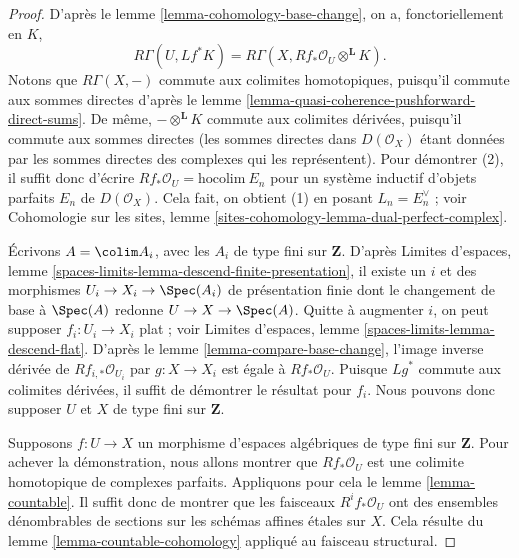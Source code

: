\begin{proof}
D'apr\`es le lemme \ref{lemma-cohomology-base-change}, on a, fonctoriellement
en $K$,
$$
R\Gamma(U, Lf^*K) = R\Gamma(X, Rf_*\mathcal{O}_U \otimes^\mathbf{L} K).
$$
Notons que $R\Gamma(X,-)$ commute aux colimites homotopiques, puisqu'il commute
aux sommes directes d'apr\`es le lemme
\ref{lemma-quasi-coherence-pushforward-direct-sums}. De m\^eme,
$-\otimes^\mathbf{L}K$ commute aux colimites d\'eriv\'ees, puisqu'il commute aux
sommes directes (les sommes directes dans $D(\mathcal{O}_X)$ \'etant donn\'ees
par les sommes directes des complexes qui les repr\'esentent). Pour d\'emontrer
(2), il suffit donc d'\'ecrire
$Rf_*\mathcal{O}_U=\text{hocolim}\ E_n$ pour un syst\`eme inductif d'objets
parfaits $E_n$ de $D(\mathcal{O}_X)$. Cela fait, on obtient (1) en posant
$L_n=E_n^\vee$ ; voir Cohomologie sur les sites, lemme
\ref{sites-cohomology-lemma-dual-perfect-complex}.

\medskip\noindent
\'Ecrivons $A=\colim A_i$, avec les $A_i$ de type fini sur $\mathbf{Z}$.
D'apr\`es Limites d'espaces, lemme
\ref{spaces-limits-lemma-descend-finite-presentation}, il existe un $i$ et des
morphismes $U_i\to X_i\to\Spec(A_i)$ de pr\'esentation finie dont le changement
de base \`a $\Spec(A)$ redonne $U\to X\to\Spec(A)$.
Quitte \`a augmenter $i$, on peut supposer $f_i:U_i\to X_i$ plat ; voir
Limites d'espaces, lemme \ref{spaces-limits-lemma-descend-flat}.
D'apr\`es le lemme \ref{lemma-compare-base-change}, l'image inverse d\'eriv\'ee
de $Rf_{i,*}\mathcal{O}_{U_i}$ par $g:X\to X_i$ est \'egale \`a
$Rf_*\mathcal{O}_U$. Puisque $Lg^*$ commute aux colimites d\'eriv\'ees, il
suffit de d\'emontrer le r\'esultat pour $f_i$. Nous pouvons donc supposer $U$
et $X$ de type fini sur $\mathbf{Z}$.

\medskip\noindent
Supposons $f:U\to X$ un morphisme d'espaces alg\'ebriques de type fini sur
$\mathbf{Z}$. Pour achever la d\'emonstration, nous allons montrer que
$Rf_*\mathcal{O}_U$ est une colimite homotopique de complexes parfaits.
Appliquons pour cela le lemme \ref{lemma-countable}. Il suffit donc de montrer
que les faisceaux $R^if_*\mathcal{O}_U$ ont des ensembles d\'enombrables de
sections sur les sch\'emas affines \'etales sur $X$. Cela r\'esulte du lemme
\ref{lemma-countable-cohomology} appliqu\'e au faisceau structural.
\end{proof}









